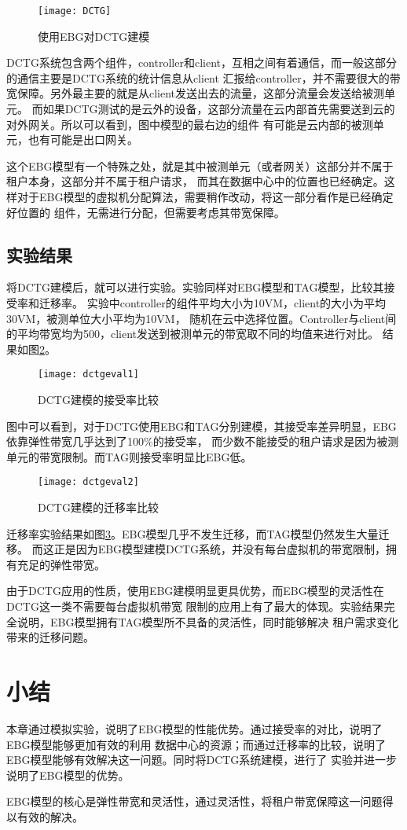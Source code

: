 \begin{figure}[h]
  \centering
  \texttt{[image: DCTG]}
  \caption{使用EBG对DCTG建模}
  \label{fig:dctgmodel}
\end{figure}

DCTG系统包含两个组件，controller和client，互相之间有着通信，而一般这部分的通信主要是DCTG系统的统计信息从client
汇报给controller，并不需要很大的带宽保障。另外最主要的就是从client发送出去的流量，这部分流量会发送给被测单元。
而如果DCTG测试的是云外的设备，这部分流量在云内部首先需要送到云的对外网关。所以可以看到，图中模型的最右边的组件
有可能是云内部的被测单元，也有可能是出口网关。

这个EBG模型有一个特殊之处，就是其中被测单元（或者网关）这部分并不属于租户本身，这部分并不属于租户请求，
而其在数据中心中的位置也已经确定。这样对于EBG模型的虚拟机分配算法，需要稍作改动，将这一部分看作是已经确定好位置的
组件，无需进行分配，但需要考虑其带宽保障。

\subsection{实验结果}
将DCTG建模后，就可以进行实验。实验同样对EBG模型和TAG模型，比较其接受率和迁移率。
实验中controller的组件平均大小为10VM，client的大小为平均30VM，被测单位大小平均为10VM，
随机在云中选择位置。Controller与client间的平均带宽均为500，client发送到被测单元的带宽取不同的均值来进行对比。
结果如图\ref{fig:dctgeval1}。

\begin{figure}[H]
  \centering
  \texttt{[image: dctgeval1]}
  \caption{DCTG建模的接受率比较}
  \label{fig:dctgeval1}
\end{figure}

图中可以看到，对于DCTG使用EBG和TAG分别建模，其接受率差异明显，EBG依靠弹性带宽几乎达到了100\%的接受率，
而少数不能接受的租户请求是因为被测单元的带宽限制。而TAG则接受率明显比EBG低。

\begin{figure}[H]
  \centering
  \texttt{[image: dctgeval2]}
  \caption{DCTG建模的迁移率比较}
  \label{fig:dctgeval2}
\end{figure}

迁移率实验结果如图\ref{fig:dctgeval2}。EBG模型几乎不发生迁移，而TAG模型仍然发生大量迁移。
而这正是因为EBG模型建模DCTG系统，并没有每台虚拟机的带宽限制，拥有充足的弹性带宽。

由于DCTG应用的性质，使用EBG建模明显更具优势，而EBG模型的灵活性在DCTG这一类不需要每台虚拟机带宽
限制的应用上有了最大的体现。实验结果完全说明，EBG模型拥有TAG模型所不具备的灵活性，同时能够解决
租户需求变化带来的迁移问题。

\section{小结}
本章通过模拟实验，说明了EBG模型的性能优势。通过接受率的对比，说明了EBG模型能够更加有效的利用
数据中心的资源；而通过迁移率的比较，说明了EBG模型能够有效解决这一问题。同时将DCTG系统建模，进行了
实验并进一步说明了EBG模型的优势。

EBG模型的核心是弹性带宽和灵活性，通过灵活性，将租户带宽保障这一问题得以有效的解决。
